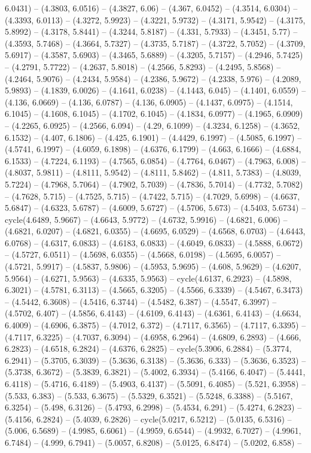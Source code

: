6.0431) -- (4.3803, 6.0516) -- (4.3827, 6.06) -- (4.367, 6.0452) -- (4.3514, 6.0304) -- (4.3393, 6.0113) -- (4.3272, 5.9923) -- (4.3221, 5.9732) -- (4.3171, 5.9542) -- (4.3175, 5.8992) -- (4.3178, 5.8441) -- (4.3244, 5.8187) -- (4.331, 5.7933) -- (4.3451, 5.77) -- (4.3593, 5.7468) -- (4.3664, 5.7327) -- (4.3735, 5.7187) -- (4.3722, 5.7052) -- (4.3709, 5.6917) -- (4.3587, 5.6903) -- (4.3465, 5.6889) -- (4.3205, 5.7157) -- (4.2946, 5.7425) -- (4.2791, 5.7722) -- (4.2637, 5.8018) -- (4.2566, 5.8293) -- (4.2495, 5.8568) -- (4.2464, 5.9076) -- (4.2434, 5.9584) -- (4.2386, 5.9672) -- (4.2338, 5.976) -- (4.2089, 5.9893) -- (4.1839, 6.0026) -- (4.1641, 6.0238) -- (4.1443, 6.045) -- (4.1401, 6.0559) -- (4.136, 6.0669) -- (4.136, 6.0787) -- (4.136, 6.0905) -- (4.1437, 6.0975) -- (4.1514, 6.1045) -- (4.1608, 6.1045) -- (4.1702, 6.1045) -- (4.1834, 6.0977) -- (4.1965, 6.0909) -- (4.2265, 6.0925) -- (4.2566, 6.094) -- (4.29, 6.1099) -- (4.3234, 6.1258) -- (4.3652, 6.1532) -- (4.407, 6.1806) -- (4.425, 6.1901) -- (4.4429, 6.1997) -- (4.5085, 6.1997) -- (4.5741, 6.1997) -- (4.6059, 6.1898) -- (4.6376, 6.1799) -- (4.663, 6.1666) -- (4.6884, 6.1533) -- (4.7224, 6.1193) -- (4.7565, 6.0854) -- (4.7764, 6.0467) -- (4.7963, 6.008) -- (4.8037, 5.9811) -- (4.8111, 5.9542) -- (4.8111, 5.8462) -- (4.811, 5.7383) -- (4.8039, 5.7224) -- (4.7968, 5.7064) -- (4.7902, 5.7039) -- (4.7836, 5.7014) -- (4.7732, 5.7082) -- (4.7628, 5.715) -- (4.7525, 5.715) -- (4.7422, 5.715) -- (4.7029, 5.6998) -- (4.6637, 5.6847) -- (4.6323, 5.6787) -- (4.6009, 5.6727) -- (4.5706, 5.673) -- (4.5403, 5.6734) -- cycle(4.6489, 5.9667) -- (4.6643, 5.9772) -- (4.6732, 5.9916) -- (4.6821, 6.006) -- (4.6821, 6.0207) -- (4.6821, 6.0355) -- (4.6695, 6.0529) -- (4.6568, 6.0703) -- (4.6443, 6.0768) -- (4.6317, 6.0833) -- (4.6183, 6.0833) -- (4.6049, 6.0833) -- (4.5888, 6.0672) -- (4.5727, 6.0511) -- (4.5698, 6.0355) -- (4.5668, 6.0198) -- (4.5695, 6.0057) -- (4.5721, 5.9917) -- (4.5837, 5.9806) -- (4.5953, 5.9695) -- (4.608, 5.9629) -- (4.6207, 5.9564) -- (4.6271, 5.9563) -- (4.6335, 5.9563) -- cycle(4.6137, 6.2923) -- (4.5898, 6.3021) -- (4.5781, 6.3113) -- (4.5665, 6.3205) -- (4.5566, 6.3339) -- (4.5467, 6.3473) -- (4.5442, 6.3608) -- (4.5416, 6.3744) -- (4.5482, 6.387) -- (4.5547, 6.3997) -- (4.5702, 6.407) -- (4.5856, 6.4143) -- (4.6109, 6.4143) -- (4.6361, 6.4143) -- (4.6634, 6.4009) -- (4.6906, 6.3875) -- (4.7012, 6.372) -- (4.7117, 6.3565) -- (4.7117, 6.3395) -- (4.7117, 6.3225) -- (4.7037, 6.3094) -- (4.6958, 6.2964) -- (4.6809, 6.2893) -- (4.666, 6.2823) -- (4.6518, 6.2824) -- (4.6376, 6.2825) -- cycle(5.3906, 6.2884) -- (5.3774, 6.2941) -- (5.3705, 6.3039) -- (5.3636, 6.3138) -- (5.3636, 6.333) -- (5.3636, 6.3523) -- (5.3738, 6.3672) -- (5.3839, 6.3821) -- (5.4002, 6.3934) -- (5.4166, 6.4047) -- (5.4441, 6.4118) -- (5.4716, 6.4189) -- (5.4903, 6.4137) -- (5.5091, 6.4085) -- (5.521, 6.3958) -- (5.533, 6.383) -- (5.533, 6.3675) -- (5.5329, 6.3521) -- (5.5248, 6.3388) -- (5.5167, 6.3254) -- (5.498, 6.3126) -- (5.4793, 6.2998) -- (5.4534, 6.291) -- (5.4274, 6.2823) -- (5.4156, 6.2824) -- (5.4039, 6.2826) -- cycle(5.0217, 6.5212) -- (5.0135, 6.5316) -- (5.006, 6.5689) -- (4.9985, 6.6061) -- (4.9959, 6.6544) -- (4.9932, 6.7027) -- (4.9961, 6.7484) -- (4.999, 6.7941) -- (5.0057, 6.8208) -- (5.0125, 6.8474) -- (5.0202, 6.858) -- 